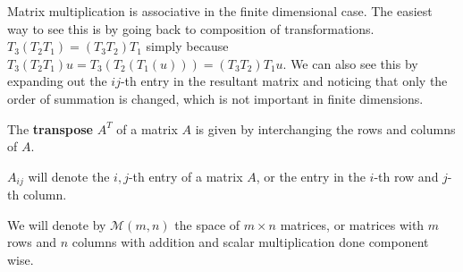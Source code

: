 \begin{rem}
Matrix multiplication is associative in the finite dimensional case. The
easiest way to see this is by going back to composition of
transformations. $T_3 (T_2 T_1) = (T_3 T_2) T_1$ simply because $T_3
(T_2 T_1) u = T_3(T_2(T_1(u))) = (T_3 T_2) T_1 u$. We can also see this
by expanding out the $ij$-th entry in the resultant matrix and noticing
that only the order of summation is changed, which is not important in
finite dimensions.
\end{rem}

\begin{df}
The \textbf{transpose} $A^T$ of a matrix $A$ is given by interchanging
the rows and columns of $A$.
\end{df}

\begin{rem}
$A_{ij}$ will denote the $i,j$-th entry of a matrix $A$, or the entry in
the $i$-th row and $j$-th column.
\end{rem}

\begin{df}
We will denote by $\mathcal{M}(m, n)$ the space of $m \times n$
matrices, or matrices with $m$ rows and $n$ columns with addition and
scalar multiplication done component wise.
\end{df}
